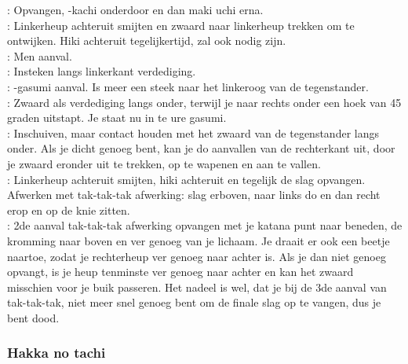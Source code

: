 \pA: Opvangen, -kachi onderdoor en dan maki uchi erna.\\
\pB: Linkerheup achteruit smijten en zwaard naar linkerheup trekken om te ontwijken. Hiki achteruit tegelijkertijd, zal ook nodig zijn.\\
\pA: Men aanval.\\
\pB: Insteken langs linkerkant verdediging.\\
\pA: -gasumi aanval. Is meer een steek naar het linkeroog van de tegenstander.\\
\pB: Zwaard als verdediging langs onder, terwijl je naar rechts onder een hoek van 45 graden uitstapt. Je staat nu in te ure gasumi.\\
\pB: Inschuiven, maar contact houden met het zwaard van de tegenstander langs onder. Als je dicht genoeg bent, kan je do aanvallen van de rechterkant uit, door je zwaard eronder uit te trekken, op te wapenen en aan te vallen.\\
\pA: Linkerheup achteruit smijten, hiki achteruit en tegelijk de slag opvangen. Afwerken met tak-tak-tak afwerking: slag erboven, naar links do en dan recht erop en op de knie zitten.\\
\pB: 2de aanval tak-tak-tak afwerking opvangen met je katana punt naar beneden, de kromming naar boven en ver genoeg van je lichaam. Je draait er ook een beetje naartoe, zodat je rechterheup ver genoeg naar achter is. Als je dan niet genoeg opvangt, is je heup tenminste ver genoeg naar achter en kan het zwaard misschien voor je buik passeren. Het nadeel is wel, dat je bij de 3de aanval van tak-tak-tak, niet meer snel genoeg bent om de finale slag op te vangen, dus je bent dood.

\subsubsection{Hakka no tachi}

